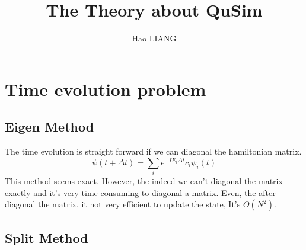 \documentclass[12pt,twoside]{article}
\begin{document}
\title{The Theory about QuSim}
\author{Hao LIANG}

\maketitle


\section{Time evolution problem}
\subsection{Eigen Method}
The time evolution is straight forward if we can diagonal the hamiltonian matrix.
$$
\psi(t+\Delta t) = \sum_i e^{-I E_i \Delta t}c_i \psi_i(t)
$$
This method seems exact. However, the indeed we can't diagonal the matrix exactly and it's very time consuming to diagonal a matrix.
Even, the after diagonal the matrix, it not very efficient to update the state, It's $O(N^2)$.

\subsection{Split Method}
\end{document}
